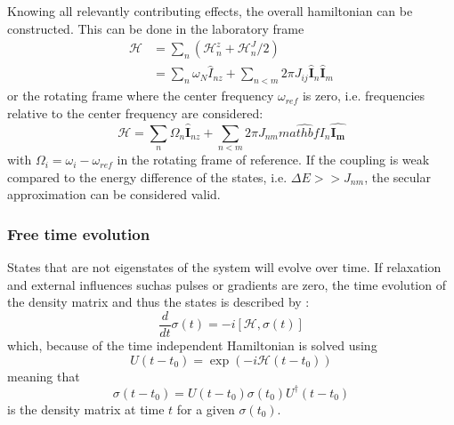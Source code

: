             Knowing all relevantly contributing effects, the overall hamiltonian can be constructed. This can be done in the laboratory frame
            \begin{align}
                \mathcal{H} &= \sum_n\left(\mathcal{H}_n^z + \mathcal{H}_n^J/2\right)\\
                            &= \sum_{n}\omega_N\hat{I}_{nz} + \sum_{n<m}2\pi J_{ij} \hat{\mathbf{I}}_n\hat{\mathbf{I}}_m
            \end{align}
            or the rotating frame where the center frequency $\omega_{ref}$ is zero, i.e. frequencies relative to the center frequency are considered:
            \begin{equation}
                \mathcal{H} = \sum_n{\Omega_n\hat{\mathbf{I}}_{nz}} + \sum_{n<m}{2\pi J_{nm}\hat{mathbf{I_n}}\hat{\mathbf{I_m}}}
            \end{equation}
            with $\Omega_i = \omega_i - \omega_{ref}$ in the rotating frame of reference.
            \cite{macomber_complete_1997}
            If the coupling is weak compared to the energy difference of the states, i.e. $\Delta E >> J_{nm}$, the secular approximation can be considered valid. 
        \subsubsection{Free time evolution}
        States that are not eigenstates of the system will evolve over time. If relaxation and external influences suchas pulses or gradients are zero, the time evolution of the density matrix and thus the states is described by \cite{sakurai_modern_2017, levitt_spin_nodate}:
        \begin{equation}
            \frac{d}{dt} \sigma(t) = -i \left[\mathcal{H}, \sigma(t)\right]
        \end{equation}
        which, because of the time independent Hamiltonian is solved using
        \begin{equation*}
            U(t-t_0) = \exp(-i\mathcal{H}(t-t_0))
        \end{equation*}
        meaning that
        \begin{equation}
            \sigma(t-t_0) = U(t-t_0) \sigma(t_0) U^\dagger(t-t_0)
        \end{equation}
        is the density matrix at time $t$ for a given $\sigma(t_0)$.
